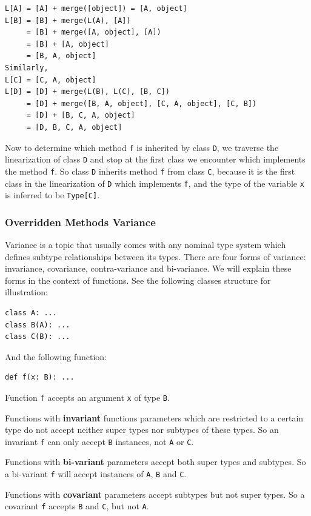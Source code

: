 \begin{lstlisting}
L[A] = [A] + merge([object]) = [A, object]
L[B] = [B] + merge(L(A), [A])
     = [B] + merge([A, object], [A])
     = [B] + [A, object]
     = [B, A, object]
Similarly,
L[C] = [C, A, object]
L[D] = [D] + merge(L(B), L(C), [B, C])
     = [D] + merge([B, A, object], [C, A, object], [C, B])
     = [D] + [B, C, A, object]
     = [D, B, C, A, object]
\end{lstlisting}
Now to determine which method \lstinline|f| is inherited by class \lstinline|D|, we traverse the linearization of class \lstinline|D| and stop at the first class we encounter which implements the method \lstinline|f|. So class \lstinline|D| inherits method \lstinline|f| from class \lstinline|C|, because it is the first class in the linearization of \lstinline|D| which implements \lstinline|f|, and the type of the variable \lstinline|x| is inferred to be \lstinline|Type[C]|.

\subsubsection{Overridden Methods Variance}
Variance is a topic that usually comes with any nominal type system which defines subtype relationships between its types. There are four forms of variance: invariance, covariance, contra-variance and bi-variance. We will explain these forms in the context of functions. See the following classes structure for illustration:
\begin{lstlisting}
class A: ...
class B(A): ...
class C(B): ...
\end{lstlisting}

And the following function:
\begin{lstlisting}
def f(x: B): ...
\end{lstlisting}

Function \lstinline|f| accepts an argument \lstinline|x| of type \lstinline|B|.

Functions with \textbf{invariant} functions parameters which are restricted to a certain type do not accept neither super types nor subtypes of these types. So an invariant \lstinline|f| can only accept \lstinline|B| instances, not \lstinline|A| or \lstinline|C|.

Functions with \textbf{bi-variant} parameters accept both super types and subtypes. So a bi-variant \lstinline|f| will accept instances of \lstinline|A|, \lstinline|B| and \lstinline|C|.

Functions with \textbf{covariant} parameters accept subtypes but not super types. So a covariant \lstinline|f| accepts \lstinline|B| and \lstinline|C|, but not \lstinline|A|.

